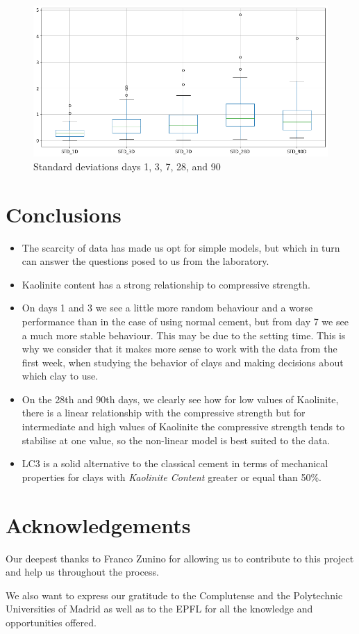 \documentclass[10pt,conference,compsocconf]{IEEEtran}
\begin{document}
\begin{figure}[htbp]
  \centering
  \includegraphics[width=\columnwidth]{figures/stds-days.png}
  \vspace{-3mm}
  \caption{Standard deviations days 1, 3, 7, 28, and 90}
  \label{fig:stds-days}
\end{figure}



\section{Conclusions}
\begin{itemize}
\item The scarcity of data has made us opt for simple models, but which in turn can answer the questions posed to us from the laboratory.

\item Kaolinite content has a strong relationship to compressive strength.
\item On days 1 and 3 we see a little more random behaviour and a worse performance than in the case of using normal cement, but from day 7 we see a much more stable behaviour. This may be due to the setting time. This is why we consider that it makes more sense to work with the data from the first week, when studying the behavior of clays and making decisions about which clay to use.
\item On the 28th and 90th days, we clearly see how for low values of Kaolinite, there is a linear relationship with the compressive strength but for intermediate and high values of Kaolinite the compressive strength tends to stabilise at one value, so the non-linear model is best suited to the data.
\item LC3 is a solid alternative to the classical cement in terms of mechanical properties for clays with \textit{Kaolinite Content} greater or equal than 50\%. 
\end{itemize}


\section*{Acknowledgements}

Our deepest thanks to Franco Zunino for allowing us to contribute to this project and help us throughout the process.

We also want to express our gratitude to the Complutense and the Polytechnic Universities of Madrid as well as to the EPFL for all the knowledge and opportunities offered.

\newpage
\nocite{*}


\end{document}
